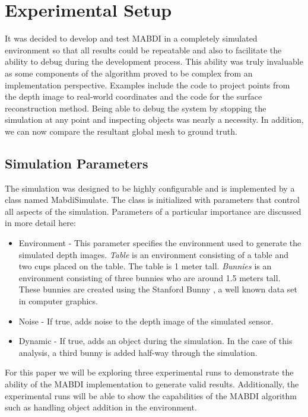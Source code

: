 \section{Experimental Setup}	\label{sec:related_works}

It was decided to develop and test MABDI in a completely simulated environment
so that all results could be repeatable and also to facilitate the ability to
debug during the development process. This ability was truly invaluable as some
components of the algorithm proved to be complex from an implementation
perspective. Examples include the code to project points from the depth image to
real-world coordinates and the code for the surface reconstruction method. Being
able to debug the system by stopping the simulation at any point and inspecting
objects was nearly a necessity. In addition, we can now compare the resultant
global mesh to ground truth.

\subsection{Simulation Parameters}

The simulation was designed to be highly configurable and is implemented by a
class named MabdiSimulate. The class is initialized with parameters that control
all aspects of the simulation. Parameters of a particular importance are
discussed in more detail here:

\begin{itemize}
    \item  Environment - This parameter specifies the environment used to generate
    the simulated depth images. \textit{Table} is an environment consisting of a
    table and two cups placed on the table. The table is 1 meter tall.
    \textit{Bunnies} is an environment consisting of three bunnies who are
    around 1.5 meters tall. These bunnies are created using the Stanford Bunny
    \cite{Turk1994}, a well known data set in computer graphics.
    \item Noise - If true, adds noise to the depth image of the simulated sensor.
    \item Dynamic - If true, adds an object during the simulation. In the case
    of this analysis, a third bunny is added half-way through the simulation.
\end{itemize}

For this paper we will be exploring three experimental runs to demonstrate the
ability of the MABDI implementation to generate valid results. Additionally, the
experimental runs will be able to show the capabilities of the MABDI algorithm
such as handling object addition in the environment.

